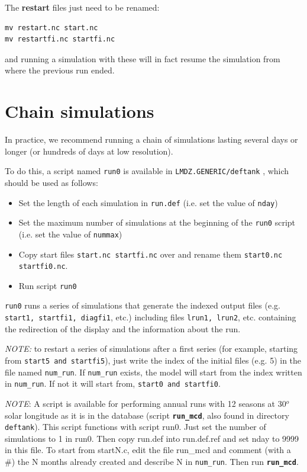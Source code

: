 \noindent
The {\bf restart} files just need to be renamed:
\begin{verbatim}
mv restart.nc start.nc
mv restartfi.nc startfi.nc
\end{verbatim}
\noindent
and running a simulation with these will in fact resume the simulation
from where the previous run ended.

\section{Chain simulations}

In practice, we recommend running a chain of simulations lasting several
days or longer (or hundreds of days at low resolution).

To do this, a script named {\tt run0} is available in
\verb+LMDZ.GENERIC/deftank+ , which should be used as follows:
\begin{itemize}
\item Set the length of each simulation in {\tt run.def}
 (i.e. set the value of {\tt nday})
\item Set the maximum number of simulations at the beginning of the {\tt run0}
script (i.e. set the value of {\tt nummax})
\item Copy start files {\tt start.nc  startfi.nc} over and rename them
      {\tt start0.nc startfi0.nc}.
\item Run script {\tt run0}
\end{itemize}

{\tt run0} runs a series of simulations that generate the indexed output
files (e.g. {\tt start1, startfi1, diagfi1}, etc.)
including files {\tt lrun1, lrun2}, etc. containing the redirection of the
display and the information about the run.

{\it NOTE:} to restart a series of simulations after a first series
(for example, starting from {\tt start5 and  startfi5}), just write the
index of the initial files (e.g. 5) in the file named {\tt num\_run}.
If {\tt num\_run} exists, the model will start from the index written in
{\tt num\_run}. If not it will start from, {\tt start0 and startfi0}.


{\it NOTE}: A script is available for performing annual runs with 12 seasons
at 30$^o$ solar longitude
as it is in the database (script {\bf \tt run\_mcd}, also found in directory
{\tt deftank}).
This script functions with script run0. Just set the number of simulations to
1 in run0. Then copy run.def into run.def.ref and set nday to 9999 in this
file. To start from startN.c, edit the file run\_mcd and comment
(with a \#) the N months already created and describe N in {\tt num\_run}.
Then run  {\bf \tt run\_mcd}.


